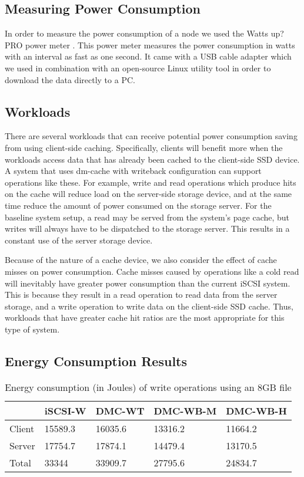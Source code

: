 \subsection{Measuring Power Consumption}

In order to measure the power consumption of a node we used the Watts up? PRO
power meter \cite{wattsup}. This power meter measures the power consumption in
watts with an interval as fast as one second. It came with a USB cable adapter
which we used in combination with an open-source Linux utility tool in order to
download the data directly to a PC.

\subsection{Workloads}

There are several workloads that can receive potential power consumption saving
from using client-side caching. Specifically, clients will benefit more when the
workloads access data that has already been cached to the client-side SSD
device. A system that uses dm-cache with writeback configuration can support
operations like these. For example, write and read operations which produce hits
on the cache will reduce load on the server-side storage device, and at the same
time reduce the amount of power consumed on the storage server. For the baseline
system setup, a read may be served from the system’s page cache, but writes will
always have to be dispatched to the storage server. This results in a constant
use of the server storage device.

Because of the nature of a cache device, we also consider the effect of cache
misses on power consumption. Cache misses caused by operations like a cold read
will inevitably have greater power consumption than the current iSCSI
system. This is because they result in a read operation to read data from the
server storage, and a write operation to write data on the client-side SSD
cache. Thus, workloads that have greater cache hit ratios are the most
appropriate for this type of system.

\subsection{Energy Consumption Results}

\begin{table}
  \centering
  \resizebox{\linewidth}{!}
  {
    \begin{tabular}{|l|l|l|l|l|}
      \hline & \bf iSCSI-W & \bf DMC-WT & \bf DMC-WB-M & \bf DMC-WB-H \\ \hline
      Client & 15589.3     & 16035.6    & 13316.2      & 11664.2      \\ \hline
      Server & 17754.7     & 17874.1    & 14479.4      & 13170.5      \\ \hline
      Total  & 33344       & 33909.7    & 27795.6      & 24834.7      \\ \hline
    \end{tabular}
  }
  \caption{Energy consumption (in Joules) of write operations using an 8GB file}
  \label{tab:write-energy}
\end{table}

